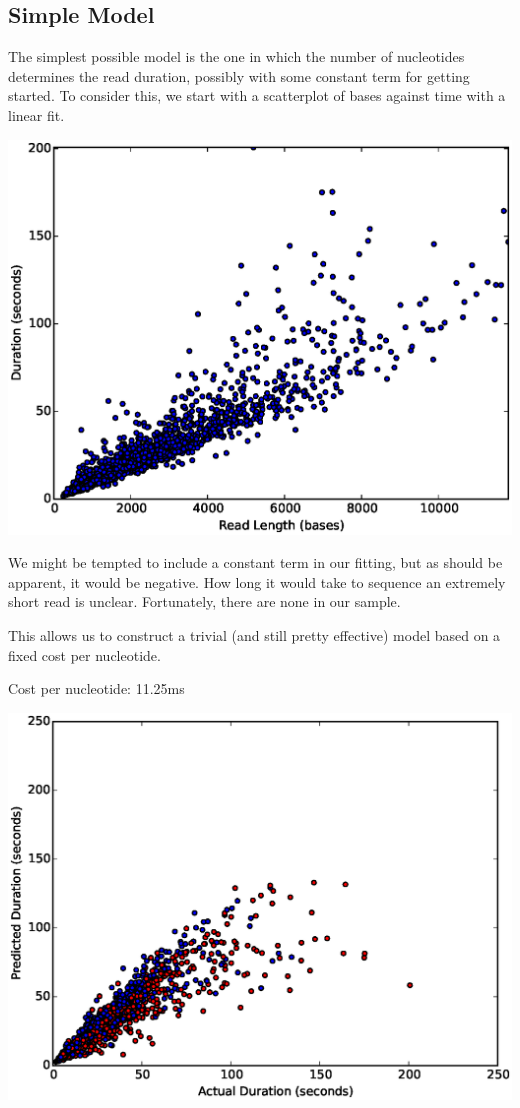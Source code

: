 \subsection*{Simple Model}

        The simplest possible model is the one in which the number of nucleotides determines the read duration,
        possibly with some constant term for getting started.  To consider this, we start with a scatterplot of
        bases against time with a linear fit.

        \begin{centering}
        \includegraphics[width=\textwidth]{part11scatterbd}
        \end{centering}

        We might be tempted to include a constant term in our fitting, but as should be apparent, it would be
        negative.  How long it would take to sequence an extremely short read is unclear.  Fortunately, there 
        are none in our sample.

        \newpage
        This allows us to construct a trivial (and still pretty effective) model based on a fixed cost per nucleotide.

        Cost per nucleotide: 11.25ms
        
\includegraphics[width=\textwidth]{part11scatter0mer}

